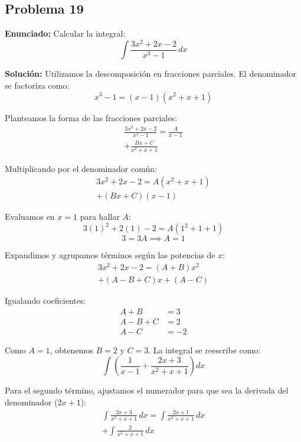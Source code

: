 \subsection*{Problema 19}
\textbf{Enunciado:} Calcular la integral:
\begin{equation*}
\int \frac{3x^2 + 2x - 2}{x^3 - 1} \, dx
\end{equation*}

\textbf{Solución:} 
Utilizamos la descomposición en fracciones parciales. El denominador se factoriza como:
\begin{equation*}
x^3 - 1 = (x - 1)(x^2 + x + 1)
\end{equation*}

Planteamos la forma de las fracciones parciales:
\begin{multline*}
\frac{3x^2 + 2x - 2}{x^3 - 1} = \frac{A}{x - 1} \\
+ \frac{Bx + C}{x^2 + x + 1}
\end{multline*}

Multiplicando por el denominador común:
\begin{multline*}
3x^2 + 2x - 2 = A(x^2 + x + 1) \\
+ (Bx + C)(x - 1)
\end{multline*}

Evaluamos en $x = 1$ para hallar $A$:
\begin{equation*}
3(1)^2 + 2(1) - 2 = A(1^2 + 1 + 1)
\end{equation*}
\begin{equation*}
3 = 3A \implies A = 1
\end{equation*}

Expandimos y agrupamos términos según las potencias de $x$:
\begin{multline*}
3x^2 + 2x - 2 = (A + B)x^2 \\
+ (A - B + C)x + (A - C)
\end{multline*}

Igualando coeficientes:
\begin{align*}
A + B &= 3 \\
A - B + C &= 2 \\
A - C &= -2
\end{align*}

Como $A = 1$, obtenemos $B = 2$ y $C = 3$. La integral se reescribe como:
\begin{equation*}
\int \left( \frac{1}{x - 1} + \frac{2x + 3}{x^2 + x + 1} \right) dx
\end{equation*}

Para el segundo término, ajustamos el numerador para que sea la derivada del denominador ($2x + 1$):
\begin{multline*}
\int \frac{2x + 3}{x^2 + x + 1} \, dx = \int \frac{2x + 1}{x^2 + x + 1} \, dx \\
+ \int \frac{2}{x^2 + x + 1} \, dx
\end{multline*}

